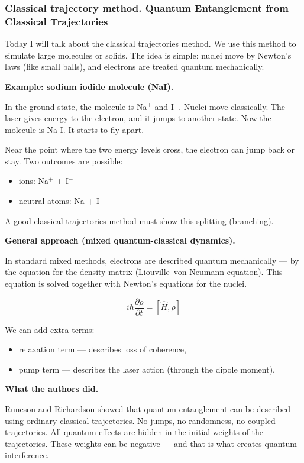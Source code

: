 \documentclass[a4paper,12pt]{article}
\begin{document}
	\subsubsection*{Classical trajectory mеthod. Quantum Entanglement from Classical Trajectories}
	
	Today I will talk about the classical trajectories method. 
	We use this method to simulate large molecules or solids. 
	The idea is simple: nuclei move by Newton's laws (like small balls), 
	and electrons are treated quantum mechanically.
	
	\textbf{Example: sodium iodide molecule (NaI).}
	
	In the ground state, the molecule is Na\(^+\) and I\(^-\). 
	Nuclei move classically. 
	The laser gives energy to the electron, and it jumps to another state. 
	Now the molecule is Na I. It starts to fly apart.
	
	Near the point where the two energy levels cross, 
	the electron can jump back or stay. 
	Two outcomes are possible:
	\begin{itemize}
		\item ions: Na\(^+\) + I\(^-\)
		\item neutral atoms: Na + I
	\end{itemize}
	
	A good classical trajectories method must show this splitting (branching).
	
	\textbf{General approach (mixed quantum-classical dynamics).}
	
	In standard mixed methods, electrons are described quantum mechanically — 
	by the equation for the density matrix (Liouville–von Neumann equation). 
	This equation is solved together with Newton's equations for the nuclei.
	
	\begin{equation}
		i\hbar \frac{\partial \rho}{\partial t} = \left[\hat{H}, \rho\right]
	\end{equation}
	
	We can add extra terms:
	\begin{itemize}
		\item relaxation term — describes loss of coherence,
		\item pump term — describes the laser action (through the dipole moment).
	\end{itemize}
	
	\textbf{What the authors did.}
	
	Runeson and Richardson showed that quantum entanglement can be described 
	using ordinary classical trajectories. No jumps, no randomness, no coupled trajectories. 
	All quantum effects are hidden in the initial weights of the trajectories. 
	These weights can be negative — and that is what creates quantum interference.
	
\end{document}
